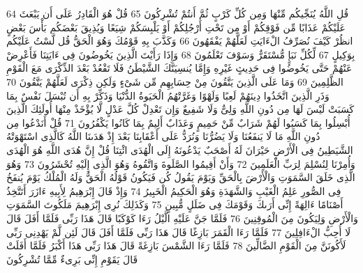 \documentclass[20pt,a4paper]{article}
\begin{document}
{\tiny\colorbox{cl_aya}{64}} قُلِ اللَّهُ يُنَجِّيكُم مِّنْهَا وَمِن كُلِّ كَرْبٍ ثُمَّ أَنتُمْ تُشْرِكُونَ
{\tiny\colorbox{cl_aya}{65}} قُلْ هُوَ الْقَادِرُ عَلَى أَن يَبْعَثَ عَلَيْكُمْ عَذَابًا مِّن فَوْقِكُمْ أَوْ مِن تَحْتِ أَرْجُلِكُمْ أَوْ يَلْبِسَكُمْ شِيَعًا وَيُذِيقَ بَعْضَكُم بَأْسَ بَعْضٍ انظُرْ كَيْفَ نُصَرِّفُ الْءَايَتِ لَعَلَّهُمْ يَفْقَهُونَ
{\tiny\colorbox{cl_aya}{66}} وَكَذَّبَ بِهِ قَوْمُكَ وَهُوَ الْحَقُّ قُل لَّسْتُ عَلَيْكُم بِوَكِيلٍ
{\tiny\colorbox{cl_aya}{67}} لِّكُلِّ نَبَإٍ مُّسْتَقَرٌّ وَسَوْفَ تَعْلَمُونَ
{\tiny\colorbox{cl_aya}{68}} وَإِذَا رَأَيْتَ الَّذِينَ يَخُوضُونَ فِى ءَايَتِنَا فَأَعْرِضْ عَنْهُمْ حَتَّى يَخُوضُوا فِى حَدِيثٍ غَيْرِهِ وَإِمَّا يُنسِيَنَّكَ الشَّيْطَنُ فَلَا تَقْعُدْ بَعْدَ الذِّكْرَى مَعَ الْقَوْمِ الظَّلِمِينَ
{\tiny\colorbox{cl_aya}{69}} وَمَا عَلَى الَّذِينَ يَتَّقُونَ مِنْ حِسَابِهِم مِّن شَىْءٍ وَلَكِن ذِكْرَى لَعَلَّهُمْ يَتَّقُونَ
{\tiny\colorbox{cl_aya}{70}} وَذَرِ الَّذِينَ اتَّخَذُوا دِينَهُمْ لَعِبًا وَلَهْوًا وَغَرَّتْهُمُ الْحَيَوةُ الدُّنْيَا وَذَكِّرْ بِهِ أَن تُبْسَلَ نَفْسٌ بِمَا كَسَبَتْ لَيْسَ لَهَا مِن دُونِ اللَّهِ وَلِىٌّ وَلَا شَفِيعٌ وَإِن تَعْدِلْ كُلَّ عَدْلٍ لَّا يُؤْخَذْ مِنْهَا أُولَئِكَ الَّذِينَ أُبْسِلُوا بِمَا كَسَبُوا لَهُمْ شَرَابٌ مِّنْ حَمِيمٍ وَعَذَابٌ أَلِيمٌ بِمَا كَانُوا يَكْفُرُونَ
{\tiny\colorbox{cl_aya}{71}} قُلْ أَنَدْعُوا مِن دُونِ اللَّهِ مَا لَا يَنفَعُنَا وَلَا يَضُرُّنَا وَنُرَدُّ عَلَى أَعْقَابِنَا بَعْدَ إِذْ هَدَىنَا اللَّهُ كَالَّذِى اسْتَهْوَتْهُ الشَّيَطِينُ فِى الْأَرْضِ حَيْرَانَ لَهُ أَصْحَبٌ يَدْعُونَهُ إِلَى الْهُدَى ائْتِنَا قُلْ إِنَّ هُدَى اللَّهِ هُوَ الْهُدَى وَأُمِرْنَا لِنُسْلِمَ لِرَبِّ الْعَلَمِينَ
{\tiny\colorbox{cl_aya}{72}} وَأَنْ أَقِيمُوا الصَّلَوةَ وَاتَّقُوهُ وَهُوَ الَّذِى إِلَيْهِ تُحْشَرُونَ
{\tiny\colorbox{cl_aya}{73}} وَهُوَ الَّذِى خَلَقَ السَّمَوَتِ وَالْأَرْضَ بِالْحَقِّ وَيَوْمَ يَقُولُ كُن فَيَكُونُ قَوْلُهُ الْحَقُّ وَلَهُ الْمُلْكُ يَوْمَ يُنفَخُ فِى الصُّورِ عَلِمُ الْغَيْبِ وَالشَّهَدَةِ وَهُوَ الْحَكِيمُ الْخَبِيرُ
{\tiny\colorbox{cl_aya}{74}} وَإِذْ قَالَ إِبْرَهِيمُ لِأَبِيهِ ءَازَرَ أَتَتَّخِذُ أَصْنَامًا ءَالِهَةً إِنِّى أَرَىكَ وَقَوْمَكَ فِى ضَلَلٍ مُّبِينٍ
{\tiny\colorbox{cl_aya}{75}} وَكَذَلِكَ نُرِى إِبْرَهِيمَ مَلَكُوتَ السَّمَوَتِ وَالْأَرْضِ وَلِيَكُونَ مِنَ الْمُوقِنِينَ
{\tiny\colorbox{cl_aya}{76}} فَلَمَّا جَنَّ عَلَيْهِ الَّيْلُ رَءَا كَوْكَبًا قَالَ هَذَا رَبِّى فَلَمَّا أَفَلَ قَالَ لَا أُحِبُّ الْءَافِلِينَ
{\tiny\colorbox{cl_aya}{77}} فَلَمَّا رَءَا الْقَمَرَ بَازِغًا قَالَ هَذَا رَبِّى فَلَمَّا أَفَلَ قَالَ لَئِن لَّمْ يَهْدِنِى رَبِّى لَأَكُونَنَّ مِنَ الْقَوْمِ الضَّالِّينَ
{\tiny\colorbox{cl_aya}{78}} فَلَمَّا رَءَا الشَّمْسَ بَازِغَةً قَالَ هَذَا رَبِّى هَذَا أَكْبَرُ فَلَمَّا أَفَلَتْ قَالَ يَقَوْمِ إِنِّى بَرِىءٌ مِّمَّا تُشْرِكُونَ
\end{document}
